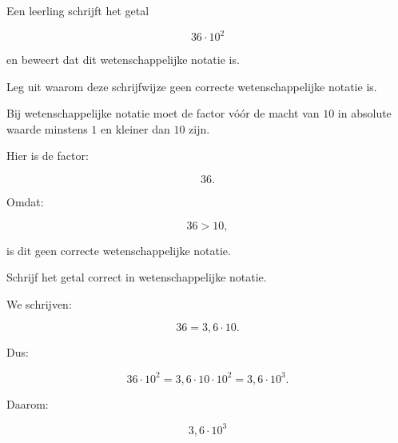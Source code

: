 \documentclass{ximera}
\begin{document}
\begin{oefening}{\oefB}

Een leerling schrijft het getal

\[
36\cdot10^2
\]

en beweert dat dit wetenschappelijke notatie is.

\begin{question}
Leg uit waarom deze schrijfwijze geen correcte wetenschappelijke notatie is.

\begin{oplossing}
Bij wetenschappelijke notatie moet de factor vóór de macht van $10$
in absolute waarde minstens $1$ en kleiner dan $10$ zijn.

Hier is de factor:

\[
36.
\]

Omdat:

\[
36>10,
\]

is dit geen correcte wetenschappelijke notatie.
\end{oplossing}
\end{question}


\begin{question}
Schrijf het getal correct in wetenschappelijke notatie.

\begin{oplossing}
We schrijven:

\[
36=3{,}6\cdot10.
\]

Dus:

\[
36\cdot10^2
=
3{,}6\cdot10\cdot10^2
=
3{,}6\cdot10^3.
\]

Daarom:

\[
\boxed{3{,}6\cdot10^3}
\]
\end{oplossing}
\end{question}

\end{oefening}
\end{document}
